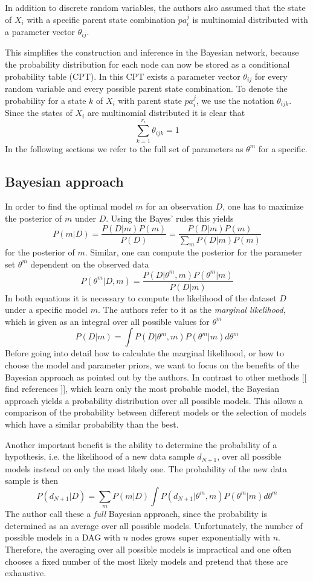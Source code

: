 \documentclass{article}
\begin{document}
	In addition	to discrete random variables, the authors also assumed that the state of $X_i$ with a specific
	parent state combination $pa_i^j$ is multinomial distributed with a parameter vector $\theta_{ij}$.
	
	This simplifies the construction and inference in the Bayesian network,	because the probability
  distribution for each node can now be stored as a conditional probability table (CPT). In this CPT
	exists a parameter vector $\theta_{ij}$ for every random variable and every possible parent state
	combination. To denote the probability for a state $k$ of $X_i$ with parent state $pa_i^j$, we
	use the notation $\theta_{ijk}$. Since the states of $X_i$ are multinomial distributed it is clear
	that
	\[
		\sum_{k=1}^{r_i} \theta_{ijk} = 1
	\]
	In the following sections we refer to the full set of parameters as $\theta^m$ for a specific.	
	
	\subsection{Bayesian approach}
	In order to find the optimal model $m$ for an observation $D$, one has to maximize the posterior of $m$
	under $D$. Using the Bayes' rules this yields 
	\[
		P(m|D) = \frac{P(D|m)P(m)}{P(D)}=\frac{P(D|m)P(m)}{\sum_m P(D|m)P(m)}
	\]
	for the posterior of $m$. Similar, one can compute the posterior for the parameter set $\theta^m$ dependent
	on the observed data
	\[
		P(\theta^m|D,m)= \frac{P(D|\theta^m,m)P(\theta^m|m)}{P(D|m)}
	\]
	In both equations it is necessary to compute the likelihood of the dataset $D$ under a specific model $m$.
	The authors refer to it as the \textit{marginal likelihood}, which is given as an integral over all
	possible values for $\theta^m$
	\[
		P(D|m) = \int P(D|\theta^m,m)P(\theta^m|m) d\theta^m
	\]
	Before going into detail how to calculate the marginal likelihood, or how to choose the model and parameter
	priors, we want to focus on the benefits of the Bayesian approach as pointed out by the authors. In
	contrast to other methods [[ find references ]], which learn only the most probable model, the
	Bayesian approach yields a probability distribution over all possible models. This allows a 
	comparison of the probability between different models or the selection of models which have a similar
	probability than the best.
	
	Another important benefit is the ability to determine the probability of a hypothesis,
	i.e. the likelihood of a	new data sample $d_{N+1}$, over all possible models
	instead on only the most likely one. The probability of the new data sample is then
	\[
		P(d_{N+1}|D)=\sum_m P(m|D)\int P(d_{N+1}|\theta^m,m)P(\theta^m|m)d\theta^m
	\]
	The author call these a \textit{full} Bayesian approach, since the probability is determined as an average
	over all possible models. Unfortunately, the number of possible models in a DAG with $n$ nodes grows
	super exponentially with $n$. Therefore, the averaging over all possible models is impractical and
	one often chooses a fixed number of the most likely models and pretend that these are exhaustive.
	
\end{document}
